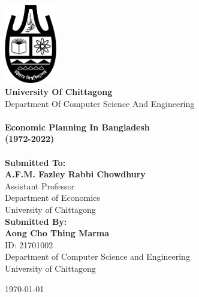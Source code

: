 \begin{titlepage}
\begin{center}

\includegraphics[width=0.17\textwidth]{Figs/CU_Logo.png}~\\[1cm]

\textbf{\huge{University Of Chittagong}}\\[0.2cm]
\Large{Department Of Computer Science And Engineering}
\\[1.3cm]


\HRule \\[0.15cm]
{
	\textbf{\Large{Economic Planning In Bangladesh \\ (1972-2022)}}
	\\[0.15cm]
}
\HRule \\[1.3cm]

\large\textbf{Submitted To:}\\
\Large\textbf{A.F.M. Fazley Rabbi Chowdhury}\\
Assistant Professor\\
Department of Economics\\
University of Chittagong\\[1cm]

\large\textbf{Submitted By:}\\
\Large\textbf{Aong Cho Thing Marma}\\
ID: 21701002\\
Department of Computer Science and Engineering\\
University of Chittagong\\

\vfill

{\large \today}

\end{center}
\end{titlepage}